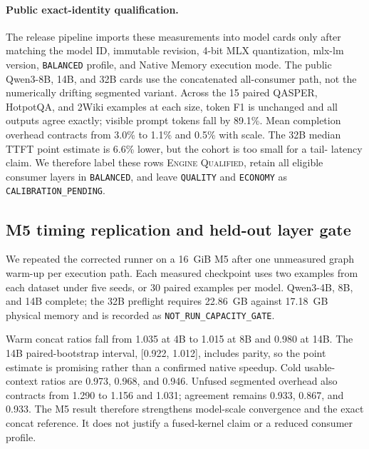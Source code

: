 \documentclass[10pt]{article}
\begin{document}
\paragraph{Public exact-identity qualification.}
The release pipeline imports these measurements into model cards only after
matching the model ID, immutable revision, 4-bit MLX quantization, mlx-lm
version, \texttt{BALANCED} profile, and Native Memory execution mode. The
public Qwen3-8B, 14B, and 32B cards use the concatenated all-consumer path,
not the numerically drifting segmented variant. Across the 15 paired QASPER,
HotpotQA, and 2Wiki examples at each size, token F1 is unchanged and all
outputs agree exactly; visible prompt tokens fall by 89.1\%. Mean completion
overhead contracts from 3.0\% to 1.1\% and 0.5\% with scale. The 32B median
TTFT point estimate is 6.6\% lower, but the cohort is too small for a tail-
latency claim. We therefore label these rows \textsc{Engine Qualified}, retain
all eligible consumer layers in \texttt{BALANCED}, and leave \texttt{QUALITY}
and \texttt{ECONOMY} as \texttt{CALIBRATION\_PENDING}.

\subsection{M5 timing replication and held-out layer gate}

We repeated the corrected runner on a 16~GiB M5 after one unmeasured graph
warm-up per execution path. Each measured checkpoint uses two examples from
each dataset under five seeds, or 30 paired examples per model. Qwen3-4B, 8B,
and 14B complete; the 32B
preflight requires 22.86~GB against 17.18~GB physical memory and is recorded as
\texttt{NOT\_RUN\_CAPACITY\_GATE}.

\begin{table}[H]
\centering
\scriptsize
\caption{Corrected M5 replication. Ratios compare matched warm or cold states;
concat preserves every E0 output. No reduced profile passes the quality gate.}
\resizebox{\linewidth}{!}{%
}
\label{tab:mlx-m5-replication}
\end{table}

Warm concat ratios fall from 1.035 at 4B to 1.015 at 8B and 0.980 at 14B.
The 14B paired-bootstrap interval, [0.922, 1.012], includes parity, so the point
estimate is promising rather than a confirmed native speedup. Cold
usable-context ratios are 0.973, 0.968, and 0.946. Unfused segmented overhead
also contracts from 1.290 to 1.156 and 1.031; agreement remains 0.933, 0.867,
and 0.933. The M5 result therefore strengthens model-scale convergence and the
exact concat reference. It does not justify a fused-kernel claim or a reduced
consumer profile.
\end{document}
